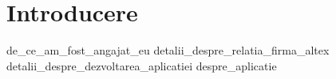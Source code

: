 \chapter{Introducere}
{de_ce_am_fost_angajat_eu}
{detalii_despre_relatia_firma_altex}
{detalii_despre_dezvoltarea_aplicatiei}
{despre_aplicatie}
